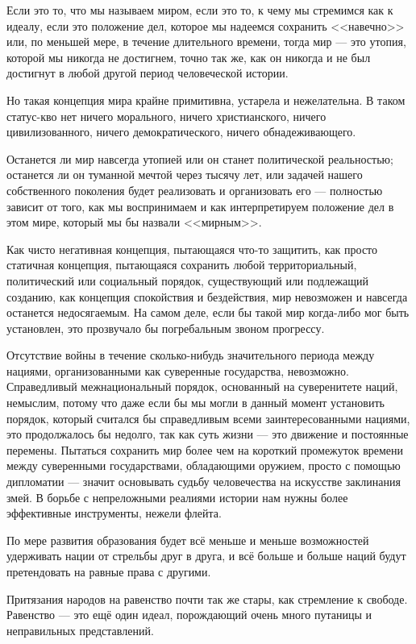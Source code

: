 Если это то, что мы называем миром, если это то, к чему мы стремимся как к идеалу, если это положение дел, которое мы надеемся сохранить <<навечно>> или, по меньшей мере, в течение длительного времени, тогда мир — это утопия, которой мы никогда не достигнем, точно так же, как он никогда и не был достигнут в любой другой период человеческой истории.

Но такая концепция мира крайне примитивна, устарела и нежелательна. В таком статус-кво нет ничего морального, ничего христианского, ничего цивилизованного, ничего демократического, ничего обнадеживающего.

Останется ли мир навсегда утопией или он станет политической реальностью; останется ли он туманной мечтой через тысячу лет, или задачей нашего собственного поколения будет реализовать и организовать его — полностью зависит от того, как мы воспринимаем и как интерпретируем положение дел в этом мире, который мы бы назвали <<мирным>>.

Как чисто негативная концепция, пытающаяся что-то защитить, как просто статичная концепция, пытающаяся сохранить любой территориальный, политический или социальный порядок, существующий или подлежащий созданию, как концепция спокойствия и бездействия, мир невозможен и навсегда останется недосягаемым. На самом деле, если бы такой мир когда-либо мог быть установлен, это прозвучало бы погребальным звоном прогрессу.

Отсутствие войны в течение сколько-нибудь значительного периода между нациями, организованными как суверенные государства, невозможно. Справедливый межнациональный порядок, основанный на суверенитете наций, немыслим, потому что даже если бы мы могли в данный момент установить порядок, который считался бы справедливым всеми заинтересованными нациями, это продолжалось бы недолго, так как суть жизни — это движение и постоянные перемены. Пытаться сохранить мир более чем на короткий промежуток времени между суверенными государствами, обладающими оружием, просто с помощью дипломатии — значит основывать судьбу человечества на искусстве заклинания змей. В борьбе с непреложными реалиями истории нам нужны более эффективные инструменты, нежели флейта.

По мере развития образования будет всё меньше и меньше возможностей удерживать нации от стрельбы друг в друга, и всё больше и больше наций будут претендовать на равные права с другими.

Притязания народов на равенство почти так же стары, как стремление к свободе. Равенство — это ещё один идеал, порождающий очень много путаницы и неправильных представлений.

